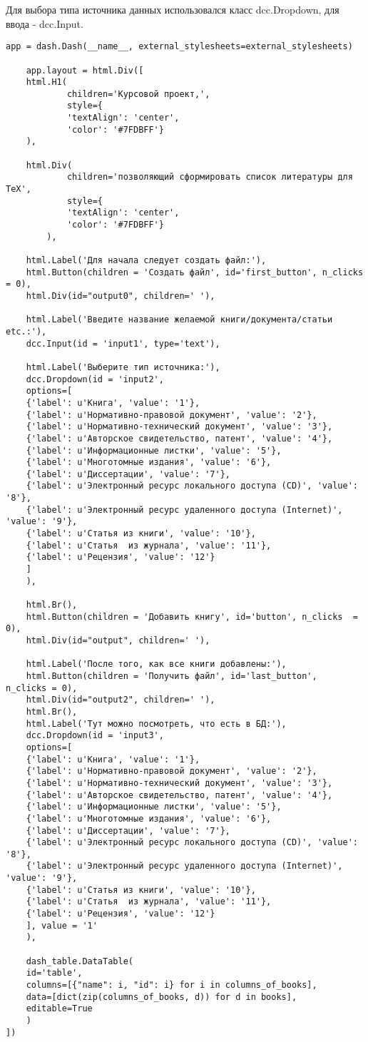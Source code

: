 Для выбора типа источника данных использовался класс dcc.Dropdown, для ввода - dcc.Input. \cite{4}

\begin{lstlisting}[label=some-code, caption=Форма добавления книги]
app = dash.Dash(__name__, external_stylesheets=external_stylesheets)

	app.layout = html.Div([
	html.H1(
			children='Курсовой проект,',
			style={
			'textAlign': 'center',
			'color': '#7FDBFF'}
	),

	html.Div(
			children='позволяющий сформировать список литературы для TeX', 
			style={
			'textAlign': 'center',
			'color': '#7FDBFF'}
		),

	html.Label('Для начала следует создать файл:'),
	html.Button(children = 'Создать файл', id='first_button', n_clicks = 0),
	html.Div(id="output0", children=' '),

	html.Label('Введите название желаемой книги/документа/статьи etc.:'),
	dcc.Input(id = 'input1', type='text'),

	html.Label('Выберите тип источника:'),
	dcc.Dropdown(id = 'input2',
	options=[
	{'label': u'Книга', 'value': '1'},
	{'label': u'Нормативно-правовой документ', 'value': '2'},
	{'label': u'Нормативно-технический документ', 'value': '3'},
	{'label': u'Авторское свидетельство, патент', 'value': '4'},
	{'label': u'Информационные листки', 'value': '5'},
	{'label': u'Многотомные издания', 'value': '6'},
	{'label': u'Диссертации', 'value': '7'},
	{'label': u'Электронный ресурс локального доступа (CD)', 'value': '8'},
	{'label': u'Электронный ресурс удаленного доступа (Internet)', 	'value': '9'},
	{'label': u'Статья из книги', 'value': '10'},
	{'label': u'Статья  из журнала', 'value': '11'},
	{'label': u'Рецензия', 'value': '12'}
	]
	),
	
	html.Br(),
	html.Button(children = 'Добавить книгу', id='button', n_clicks 	= 0),
	html.Div(id="output", children=' '),

	html.Label('После того, как все книги добавлены:'),
	html.Button(children = 'Получить файл', id='last_button', 	n_clicks = 0),
	html.Div(id="output2", children=' '),
	html.Br(),
	html.Label('Тут можно посмотреть, что есть в БД:'),
	dcc.Dropdown(id = 'input3',
	options=[
	{'label': u'Книга', 'value': '1'},
	{'label': u'Нормативно-правовой документ', 'value': '2'},
	{'label': u'Нормативно-технический документ', 'value': '3'},
	{'label': u'Авторское свидетельство, патент', 'value': '4'},
	{'label': u'Информационные листки', 'value': '5'},
	{'label': u'Многотомные издания', 'value': '6'},
	{'label': u'Диссертации', 'value': '7'},
	{'label': u'Электронный ресурс локального доступа (CD)', 'value': '8'},
	{'label': u'Электронный ресурс удаленного доступа (Internet)', 'value': '9'},
	{'label': u'Статья из книги', 'value': '10'},
	{'label': u'Статья  из журнала', 'value': '11'},
	{'label': u'Рецензия', 'value': '12'}
	], value = '1'
	),

	dash_table.DataTable(
	id='table',
	columns=[{"name": i, "id": i} for i in columns_of_books],
	data=[dict(zip(columns_of_books, d)) for d in books],
	editable=True
	)
])

\end{lstlisting}

